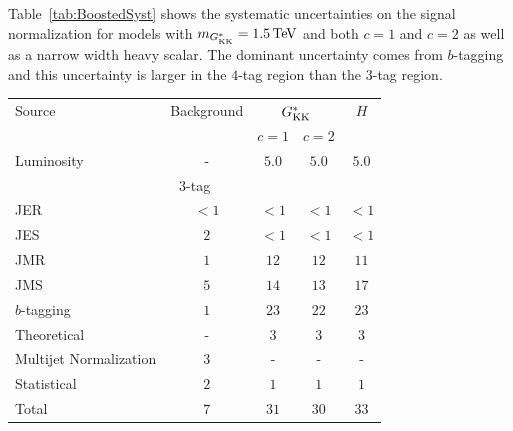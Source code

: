 Table~\ref{tab:BoostedSyst} shows the systematic uncertainties on the signal normalization for models with $m_{\Gkk} = 1.5 \TeV$ and both $c = 1$ and $c = 2$ as well as a narrow width heavy scalar. The dominant uncertainty comes from $b$-tagging and this uncertainty is larger in the $4$-tag region than the $3$-tag region. 

\begin{table}[ht!]
\captionsetup{justification=centering}
\begin{center} 
\begin{tabular}{  l  c  c  c  c }
\toprule
 Source          & Background    & \multicolumn{2}{c}{$G^*_{\rm KK}$} & $H$ \\
                 &         & $c = 1$ & $c = 2$  &     \\
\midrule
   Luminosity    &  -      &  $5.0$    &  $5.0$    & $5.0$ \\
\midrule
                \multicolumn{5}{c}{$3$-tag}  \\
\midrule
   JER           &  $<1$   &  $< 1$   &  $<1$   & $< 1$ \\
   JES           &  $2$    &  $<1$    &  $< 1$    & $<1$ \\
   JMR           &  $1$    &  $12$   &  $12$   & $11$  \\
   JMS           &  $5$    &  $14$   &  $13$   & $17$  \\
   $b$-tagging   &  $1$   &  $23$   &  $22$   & $23$  \\
   Theoretical   &  -      &  $3$    &  $3$    & $3$ \\
   Multijet Normalization      &  $3$    &  -      &  -      &  -  \\
   Statistical     &  $2$    &  $1$      &  $1$      &  $1$  \\
   \midrule
   Total         &  $7$    &  $31$   &  $30$   &  $33$ \\

\end{tabular}
\end{center}
\end{table}
